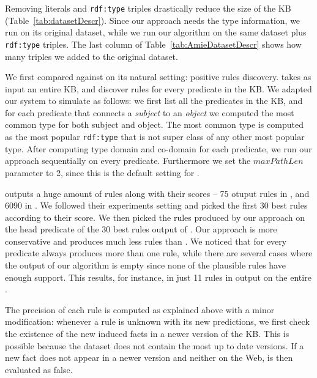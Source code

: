 Removing literals and \texttt{rdf:type} triples drastically reduce the size of the KB (Table~\ref{tab:datasetDescr}). Since our approach needs the type information, we run \amie on its original dataset, while we run our algorithm on the same dataset plus \texttt{rdf:type} triples. The last column of Table~\ref{tab:AmieDatasetDescr} shows how many triples we added to the original \amie dataset.

 We first compared against \amie on its natural setting: positive rules discovery. \amie takes as input an entire KB, and discover rules for every predicate in the KB. We adapted our system to simulate \amie as follows: we first list all the predicates in the KB, and for each predicate that connects a \emph{subject} to an \emph{object} we computed the most common type for both subject and object. The most common type is computed as the most popular \texttt{rdf:type} that is not super class of any other most popular type. After computing type domain and co-domain for each predicate, we run our approach sequentially on every predicate. Furthermore we set the $maxPathLen$ parameter to 2, since this is the default setting for \amie.

\amie outputs a huge amount of rules along with their scores -- 75 otuput rules in \yago, and 6090 in \dbpedia. We followed their experiments setting and picked the first 30 best rules according to their score. We then picked the rules produced by our approach on the head predicate of the 30 best rules output of \amie. Our approach is more conservative and produces much less rules than \amie. We noticed that for every predicate \amie always produces more than one rule, while there are several cases where the output of our algorithm is empty since none of the plausible rules have enough support. This results, for instance, in just 11 rules in output on the entire \yago.

 The precision of each rule is computed as explained above with a minor modification: whenever a rule is unknown with its new predictions, we first check the existence of the new induced facts in a newer version of the KB. This is possible because the dataset does not contain the most up to date versions. If a new fact does not appear in a newer version and neither on the Web, is then evaluated as false.

